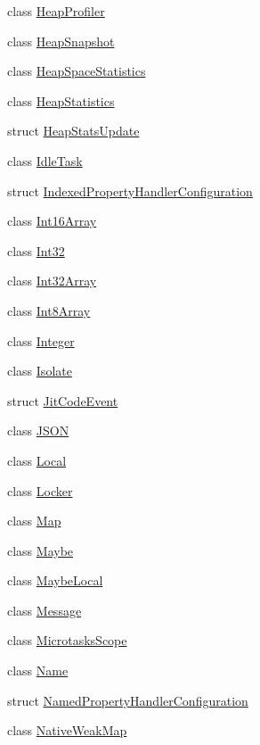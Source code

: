 \begin{DoxyCompactItemize}
\item 
class \hyperlink{classv8_1_1HeapProfiler}{Heap\+Profiler}
\item 
class \hyperlink{classv8_1_1HeapSnapshot}{Heap\+Snapshot}
\item 
class \hyperlink{classv8_1_1HeapSpaceStatistics}{Heap\+Space\+Statistics}
\item 
class \hyperlink{classv8_1_1HeapStatistics}{Heap\+Statistics}
\item 
struct \hyperlink{structv8_1_1HeapStatsUpdate}{Heap\+Stats\+Update}
\item 
class \hyperlink{classv8_1_1IdleTask}{Idle\+Task}
\item 
struct \hyperlink{structv8_1_1IndexedPropertyHandlerConfiguration}{Indexed\+Property\+Handler\+Configuration}
\item 
class \hyperlink{classv8_1_1Int16Array}{Int16\+Array}
\item 
class \hyperlink{classv8_1_1Int32}{Int32}
\item 
class \hyperlink{classv8_1_1Int32Array}{Int32\+Array}
\item 
class \hyperlink{classv8_1_1Int8Array}{Int8\+Array}
\item 
class \hyperlink{classv8_1_1Integer}{Integer}
\item 
class \hyperlink{classv8_1_1Isolate}{Isolate}
\item 
struct \hyperlink{structv8_1_1JitCodeEvent}{Jit\+Code\+Event}
\item 
class \hyperlink{classv8_1_1JSON}{J\+S\+ON}
\item 
class \hyperlink{classv8_1_1Local}{Local}
\item 
class \hyperlink{classv8_1_1Locker}{Locker}
\item 
class \hyperlink{classv8_1_1Map}{Map}
\item 
class \hyperlink{classv8_1_1Maybe}{Maybe}
\item 
class \hyperlink{classv8_1_1MaybeLocal}{Maybe\+Local}
\item 
class \hyperlink{classv8_1_1Message}{Message}
\item 
class \hyperlink{classv8_1_1MicrotasksScope}{Microtasks\+Scope}
\item 
class \hyperlink{classv8_1_1Name}{Name}
\item 
struct \hyperlink{structv8_1_1NamedPropertyHandlerConfiguration}{Named\+Property\+Handler\+Configuration}
\item 
class \hyperlink{classv8_1_1NativeWeakMap}{Native\+Weak\+Map}
\item 

\end{DoxyCompactItemize}
